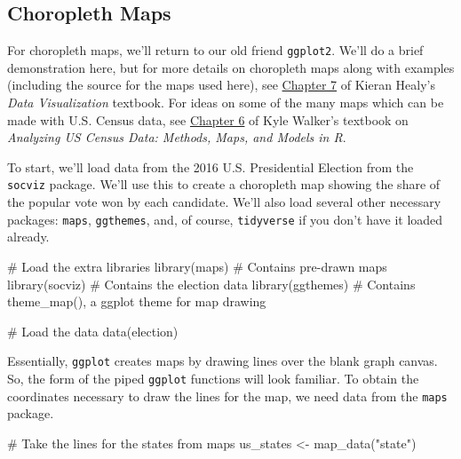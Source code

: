 \documentclass[
  letterpaper,
]{book}
\newenvironment{Shaded}{\begin{snugshade}}{\end{snugshade}}
\newcommand{\CommentTok}[1]{\textcolor[rgb]{0.37,0.37,0.37}{#1}}
\newcommand{\FunctionTok}[1]{\textcolor[rgb]{0.28,0.35,0.67}{#1}}
\newcommand{\NormalTok}[1]{\textcolor[rgb]{0.00,0.23,0.31}{#1}}
\newcommand{\OtherTok}[1]{\textcolor[rgb]{0.00,0.23,0.31}{#1}}
\newcommand{\StringTok}[1]{\textcolor[rgb]{0.13,0.47,0.30}{#1}}
\begin{document}
\hypertarget{choropleth-maps}{%
\subsection{Choropleth Maps}\label{choropleth-maps}}

For choropleth maps, we'll return to our old friend \texttt{ggplot2}.
We'll do a brief demonstration here, but for more details on choropleth
maps along with examples (including the source for the maps used here),
see \href{https://socviz.co/maps.html}{Chapter 7} of Kieran Healy's
\emph{Data Visualization} textbook. For ideas on some of the many maps
which can be made with U.S. Census data, see
\href{https://walker-data.com/census-r/mapping-census-data-with-r.html}{Chapter
6} of Kyle Walker's textbook on \emph{Analyzing US Census Data: Methods,
Maps, and Models in R}.

To start, we'll load data from the 2016 U.S. Presidential Election from
the \texttt{socviz} package. We'll use this to create a choropleth map
showing the share of the popular vote won by each candidate. We'll also
load several other necessary packages: \texttt{maps}, \texttt{ggthemes},
and, of course, \texttt{tidyverse} if you don't have it loaded already.

\begin{Shaded}
\begin{Highlighting}[]
\CommentTok{\# Load the extra libraries}
\FunctionTok{library}\NormalTok{(maps)       }\CommentTok{\# Contains pre{-}drawn maps}
\FunctionTok{library}\NormalTok{(socviz)     }\CommentTok{\# Contains the election data}
\FunctionTok{library}\NormalTok{(ggthemes)   }\CommentTok{\# Contains theme\_map(), a ggplot theme for map drawing}

\CommentTok{\# Load the data}
\FunctionTok{data}\NormalTok{(election)}
\end{Highlighting}
\end{Shaded}

Essentially, \texttt{ggplot} creates maps by drawing lines over the
blank graph canvas. So, the form of the piped \texttt{ggplot} functions
will look familiar. To obtain the coordinates necessary to draw the
lines for the map, we need data from the \texttt{maps} package.

\begin{Shaded}
\begin{Highlighting}[]
\CommentTok{\# Take the lines for the states from \textasciigrave{}maps\textasciigrave{}}
\NormalTok{us\_states }\OtherTok{\textless{}{-}} \FunctionTok{map\_data}\NormalTok{(}\StringTok{"state"}\NormalTok{)}
\end{Highlighting}
\end{Shaded}
\end{document}
